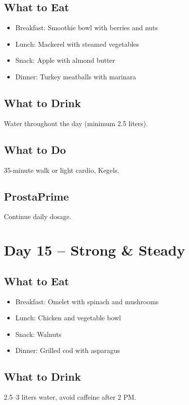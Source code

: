 \documentclass[11pt,oneside]{book}
\begin{document}
\section*{What to Eat}
\begin{itemize}[leftmargin=*]
\item Breakfast: Smoothie bowl with berries and nuts
\item Lunch: Mackerel with steamed vegetables
\item Snack: Apple with almond butter
\item Dinner: Turkey meatballs with marinara
\end{itemize}

\section*{What to Drink}
Water throughout the day (minimum 2.5 liters).

\section*{What to Do}
35-minute walk or light cardio, Kegels.

\section*{ProstaPrime}
Continue daily dosage.

\clearpage


\chapter*{Day 15 – Strong & Steady}

\section*{What to Eat}
\begin{itemize}[leftmargin=*]
\item Breakfast: Omelet with spinach and mushrooms
\item Lunch: Chicken and vegetable bowl
\item Snack: Walnuts
\item Dinner: Grilled cod with asparagus
\end{itemize}

\section*{What to Drink}
2.5--3 liters water, avoid caffeine after 2 PM.
\end{document}
